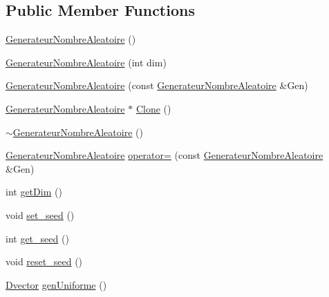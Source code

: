 \subsection*{Public Member Functions}
\begin{DoxyCompactItemize}
\item 
\hyperlink{classGenerateurNombreAleatoire_ad6a159bdea95f54c4363b59944e80030}{Generateur\-Nombre\-Aleatoire} ()
\item 
\hyperlink{classGenerateurNombreAleatoire_aa39e185dcbd1356b28227b2ea24d8138}{Generateur\-Nombre\-Aleatoire} (int dim)
\item 
\hyperlink{classGenerateurNombreAleatoire_ad9a7dedf1f5f2ce3c3c3121f66e0fbed}{Generateur\-Nombre\-Aleatoire} (const \hyperlink{classGenerateurNombreAleatoire}{Generateur\-Nombre\-Aleatoire} \&Gen)
\item 
\hyperlink{classGenerateurNombreAleatoire}{Generateur\-Nombre\-Aleatoire} $\ast$ \hyperlink{classGenerateurNombreAleatoire_a93af1b3a6b970d2d5e5a078c22fa5478}{Clone} ()
\item 
\hyperlink{classGenerateurNombreAleatoire_a4b0f91e7003697042cc1d58f6f7fc313}{$\sim$\-Generateur\-Nombre\-Aleatoire} ()
\item 
\hyperlink{classGenerateurNombreAleatoire}{Generateur\-Nombre\-Aleatoire} \hyperlink{classGenerateurNombreAleatoire_a3f058a96aa678a3efb841c5ae5313917}{operator=} (const \hyperlink{classGenerateurNombreAleatoire}{Generateur\-Nombre\-Aleatoire} \&Gen)
\item 
int \hyperlink{classGenerateurNombreAleatoire_a378a808ce192f8e6e79197344b0adc95}{get\-Dim} ()
\item 
void \hyperlink{classGenerateurNombreAleatoire_ad189d10901dea1aea438a0fb10f65f47}{set\-\_\-seed} ()
\item 
int \hyperlink{classGenerateurNombreAleatoire_a2cd3efb7eedf9ab71084f77c9e02562d}{get\-\_\-seed} ()
\item 
void \hyperlink{classGenerateurNombreAleatoire_a40f479064b1d228de24e06bbb14969f6}{reset\-\_\-seed} ()
\item 
\hyperlink{classDvector}{Dvector} \hyperlink{classGenerateurNombreAleatoire_a8ae22e6422271e438df2089c4bc6a8b9}{gen\-Uniforme} ()
\end{DoxyCompactItemize}


